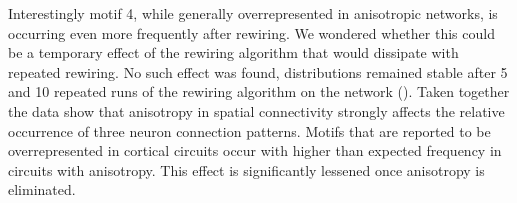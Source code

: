 Interestingly motif 4, while generally overrepresented in anisotropic
networks, is occurring even more frequently after rewiring. We
wondered whether this could be a temporary effect of the rewiring
algorithm that would dissipate with repeated rewiring. No such effect was
found, distributions remained stable after 5 and 10 repeated runs of
the rewiring algorithm on the network
(). Taken together the data show that
anisotropy in spatial connectivity strongly affects the relative
occurrence of three neuron connection patterns. Motifs that are
reported to be overrepresented in cortical circuits occur with higher
than expected frequency in circuits with anisotropy. This effect is
significantly lessened once anisotropy is eliminated.












